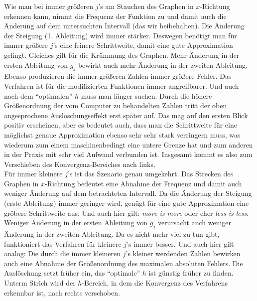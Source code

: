 \documentclass{scrartcl}
\begin{document}
Wie man bei immer größeren $j$'s am Stauchen des Graphen in $x$-Richtung erkennen kann, nimmt die Frequenz der Funktion zu und damit auch die Änderung auf dem untersuchten Intervall (das wir beibehalten). Die Änderung der Steigung (1. Ableitung) wird immer stärker. Deswegen benötigt man für immer größere $j$'s eine feinere Schrittweite, damit eine gute Approximation gelingt. Gleiches gilt für die Krümmung des Graphen. Mehr Änderung in der ersten Ableitung von $g_j$ bewirkt auch mehr Änderung in der zweiten Ableitung. Ebenso produzieren die immer größeren Zahlen immer größere Fehler. Das Verfahren ist für die modifizierten Funktionen immer angreifbarer. Und auch nach dem "`optimalen"' $h$ muss man länger suchen. Durch die höhere Größenordnung der vom Computer zu behandelten Zahlen tritt der oben angesprochene Auslöschungseffekt erst später auf. Das mag auf den ersten Blick positiv erscheinen, aber es bedeutet auch, dass man die Schrittweite für eine möglichst genaue Approximation ebenso sehr sehr stark verringern muss, was wiederum zum einem maschinenbedingt eine untere Grenze hat und zum anderen in der Praxis mit sehr viel Aufwand verbunden ist. Insgesamt kommt es also zum Verschieben des Konvergenz-Bereiches nach links. \\
Für immer kleinere $j$'s ist das Szenario genau umgekehrt. Das Strecken des Graphen in $x$-Richtung bedeutet eine Abnahme der Frequenz und damit auch weniger Änderung auf dem betrachteten Intervall. Da die Änderung der Steigung (erste Ableitung) immer geringer wird, genügt für eine gute Approximation eine gröbere Schrittweite aus. Und auch hier gilt: \textit{more is more} oder eher \textit{less is less}. Weniger Änderung in der ersten Ableitung von $g_j$ verursacht auch weniger Änderung in der zweiten Ableitung. Da es nicht mehr viel zu tun gibt, funktioniert das Verfahren für kleinere $j$'s immer besser. Und auch hier gilt analog: Die durch die immer kleineren $j$'s kleiner werdenden Zahlen bewirken auch eine Abnahme der Größenordnung des maximalen absoluten Fehlers. Die Auslöschung setzt früher ein, das "`optimale"' $h$ ist günstig früher zu finden. Unterm Strich wird der $h$-Bereich, in dem die Konvergenz des Verfahrens erkennbar ist, nach rechts verschoben. \\
\end{document}
